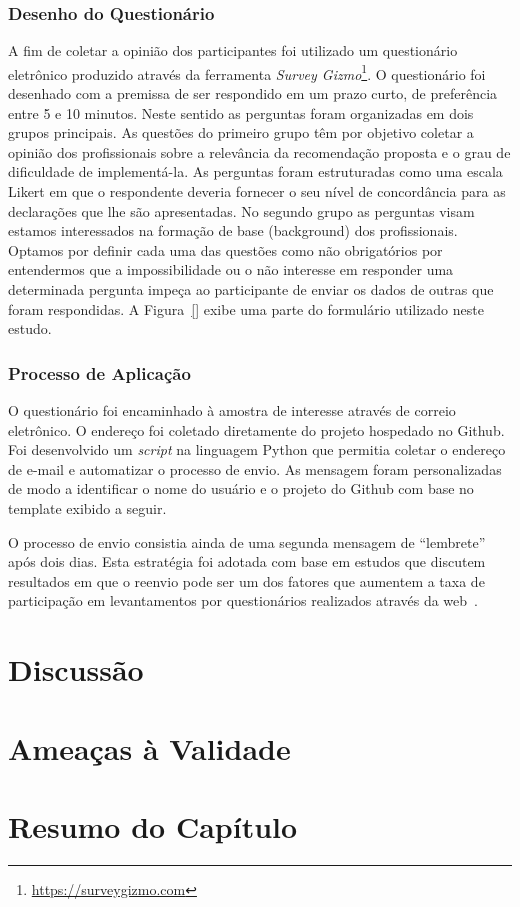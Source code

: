\subsubsection{Desenho do Questionário}
\label{ssub:sug_melhoria_desenho_questionario}

A fim de coletar a opinião dos participantes foi utilizado um questionário
eletrônico produzido através da ferramenta \textit{Survey
	Gizmo}\footnote{\url{https://surveygizmo.com}}. O questionário foi desenhado
com a premissa de ser respondido em um prazo curto, de preferência entre 5 e 10
minutos. Neste sentido as perguntas foram organizadas em dois grupos principais.
As questões do primeiro grupo têm por objetivo coletar a opinião dos
profissionais sobre a relevância da recomendação proposta e o grau de
dificuldade de implementá-la. As perguntas foram estruturadas como uma escala
Likert em que o respondente deveria fornecer o seu nível de concordância para as
declarações que lhe são apresentadas. No segundo grupo as perguntas visam
estamos interessados na formação de base (background) dos profissionais. Optamos
por definir cada uma das questões como não obrigatórios por entendermos que a
impossibilidade ou o não interesse em responder uma determinada pergunta impeça
ao participante de enviar os dados de outras que foram respondidas. A
Figura~\ref{} exibe uma parte do formulário utilizado neste estudo.


\subsubsection{Processo de Aplicação}
\label{ssub:processo_de_aplicação}

O questionário foi encaminhado à amostra de interesse através de correio
eletrônico. O endereço foi coletado diretamente do projeto hospedado no Github.
Foi desenvolvido um \textit{script} na linguagem Python que permitia coletar o
endereço de e-mail e automatizar o processo de envio. As mensagem foram
personalizadas de modo a identificar o nome do usuário e o projeto do Github
com base no template exibido a seguir.


O processo de envio consistia ainda de uma segunda mensagem de ``lembrete'' após
dois dias. Esta estratégia foi adotada com base em estudos que discutem
resultados em que o reenvio pode ser um dos fatores que aumentem a taxa de
participação em levantamentos por questionários realizados através da
web~\cite{fan2010factors}.

\section{Discussão}
\label{sec:sug_melhoria_discussao}

\section{Ameaças à Validade}
\label{sec:sug_melhoria_ameacas}

\section{Resumo do Capítulo}
\label{sec:sug_melhoria_resumo}

